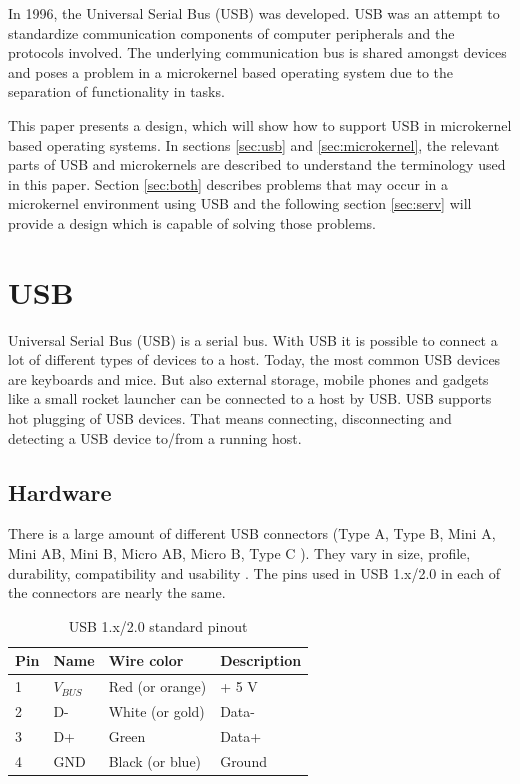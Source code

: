 \documentclass{acm_proc_article-sp}
\begin{document}
In 1996, the Universal Serial Bus (USB) was developed.
USB was an attempt to standardize communication components of computer peripherals and
the protocols involved.
The underlying communication bus is shared amongst devices and poses a problem in a microkernel based
operating system due to the separation of functionality in tasks.

This paper presents a design, which will show how to support USB in microkernel based operating systems.
In sections \ref{sec:usb} and \ref{sec:microkernel}, the relevant parts of USB and microkernels are described
to understand the terminology used in this paper.
Section \ref{sec:both} describes problems that may occur in a microkernel environment using USB and the following
section \ref{sec:serv} will provide a design which is capable of solving those problems.

\section{USB}
Universal Serial Bus (USB) is a serial bus.
With USB it is possible to connect a lot of different types of devices to a host.
Today, the most common USB devices are keyboards and mice.
But also external storage, mobile phones and gadgets like a small rocket launcher can be connected to a host by USB.
USB supports hot plugging of USB devices.
That means connecting, disconnecting and detecting a USB device to/from a running host.

\subsection{Hardware}
There is a large amount of different USB connectors (Type A, Type B, Mini A, Mini AB, Mini B, Micro AB, Micro B, Type C \cite{usborg}).
They vary in size, profile, durability, compatibility and usability \cite{dowell}.
The pins used in USB 1.x/2.0 in each of the connectors are nearly the same.

\begin{table}
\centering
\caption{USB 1.x/2.0 standard pinout}
\begin{tabular}{|l|l|l|l|} \hline
Pin & Name & Wire color & Description\\ \hline
1 & $V_{BUS}$ & Red (or orange) & + 5 V\\ \hline
2 & D- & White (or gold) & Data-\\ \hline
3 & D+ & Green & Data+\\ \hline
4 & GND & Black (or blue) & Ground\\ \hline
\end{tabular}
\end{table}
\end{document}
